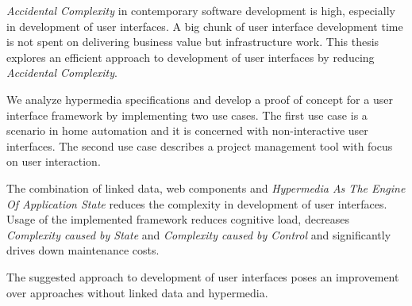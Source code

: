 \textit{Accidental Complexity} in contemporary software development is high, especially in development of user interfaces. A big chunk of user interface development time is not spent on delivering business value but infrastructure work. This thesis explores an efficient approach to development of user interfaces by reducing \textit{Accidental Complexity}.

We analyze hypermedia specifications and develop a proof of concept for a user interface framework by implementing two use cases. The first use case is a scenario in home automation and it is concerned with non-interactive user interfaces. The second use case describes a project management tool with focus on user interaction.

The combination of linked data, web components and \textit{Hypermedia As The Engine Of Application State} reduces the complexity in development of user interfaces. Usage of the implemented framework reduces \gls{cognitive load}, decreases \textit{Complexity caused by State} and \textit{Complexity caused by Control} and significantly drives down maintenance costs.

The suggested approach to development of user interfaces poses an improvement over approaches without linked data and hypermedia.
